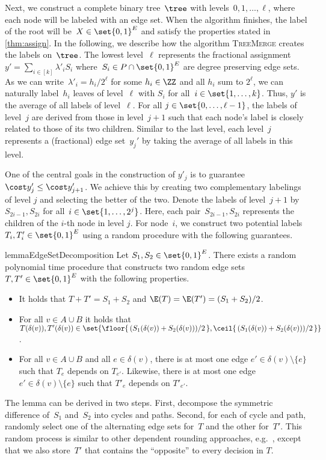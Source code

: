 Next, we construct a complete binary tree~$\tree$ with levels~$0,1,\dotsc,\ell$, where each node will be labeled with an edge set.
When the algorithm finishes, the label of the root will be~$X \in \set{0,1}^E$ and satisfy the properties stated in \cref{thm:assign}.
In the following, we describe how the algorithm \textsc{TreeMerge} creates the labels on~$\tree$.
The lowest level~$\ell$ represents the fractional assignment~$y' = \sum_{i \in [k]} \lambda'_i S_i$ where~$S_i \in P\cap \set{0,1}^E$ are degree preserving edge sets.
As we can write~$\lambda'_i = h_i/2^{\ell}$ 
for some $h_i\in\ZZ$ and all $h_i$ sum to $2^{\ell}$, we can naturally label~$h_i$ leaves of level~$\ell$ with $S_i$ for all~$i \in \set{1, \dotsc, k}$.
Thus, $y'$ is the average of all labels of level~$\ell$.
For all $j \in \set{0, \dotsc, \ell-1}$, the labels of level~$j$ are derived from those in level~$j + 1$ such that each node's label is closely related to
those of its two children.
Similar to the last level, each level~$j$ represents a (fractional) edge set~$y_j'$ by taking the average of all labels in this level.

One of the central goals in the construction of $y'_j$ is to guarantee~$\cost y_{j}' \le \cost y_{j+1}'$.
We achieve this by creating two complementary
labelings of level $j$ and selecting the better
of the two.
Denote the labels of level~$j+1$ by~$S_{2i-1}, S_{2i}$ for all~$i\in\set{1, \dotsc, 2^{j}}$. 
Here, each pair~$S_{2i-1}, S_{2i}$ represents the children of the $i$-th node in level $j$. For node~$i$, we construct two potential labels~$T_{i}, T_{i}' \in \set{0,1}^E$ using a random procedure with the following guarantees.

\begin{restatable}{lemma}{EdgeSetDecomposition}
    \label{lem:decomposition}
    Let $S_1, S_2 \in \set{0,1}^E$.
    There exists a random polynomial time procedure that constructs two random edge sets $T, T' \in \set{0,1}^E$ with the following properties. 
    \begin{itemize}
        \item It holds that $T + T' = S_1 + S_2$ and $\E(T) = \E(T') = (S_1+S_2)/2$.
        \item For all $v \in A\cup B$ it holds that $T(\delta(v)), T'(\delta(v)) \in \set{\floor{\,(S_1(\delta(v)) + S_2(\delta(v)))/2 \,}, \ceil{\,(S_1(\delta(v)) + S_2(\delta(v)))/2 \,}}$.
        \item For all $v \in A\cup B$ and all $e \in \delta(v)$, there is at most one edge $e' \in \delta(v)\setminus\{e\}$ such that $T_e$ depends on $T_{e'}$. Likewise, there is at most one edge $e' \in \delta(v)\setminus\{e\}$ such that $T'_e$ depends on $T'_{e'}$. 
    \end{itemize}
\end{restatable}
\medskip
\noindent The lemma can be derived in two steps. First, decompose the symmetric difference of~$S_1$ and~$S_2$ into cycles and paths.
Second, for each of cycle and path, randomly select one of the alternating edge sets for~$T$ and the other for~$T'$.
This random process is similar to other dependent rounding approaches, e.g.~\cite{ChekuriVZ10,GandhiKPS06}, except that we also store~$T'$ that contains the ``opposite'' to every decision in $T$.

